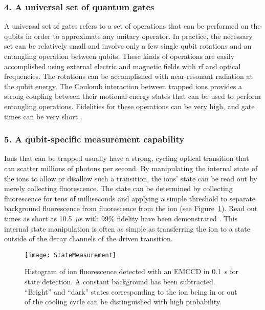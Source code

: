 \subsubsection{4. A universal set of quantum gates}

A universal set of gates refers to a set of operations that can be performed on the qubits in order to approximate any unitary operator.  In practice, the necessary set can be relatively small and involve only a few single qubit rotations and an entangling operation between qubits.  These kinds of operations are easily accomplished using external electric and magnetic fields with rf and optical frequencies.  The rotations can be accomplished with near-resonant radiation at the qubit energy. The Coulomb interaction between trapped ions provides a strong coupling between their motional energy states that can be used to perform entangling operations.  Fidelities for these operations can be very high, and gate times can be very short \cite{Mount:13}.

\subsubsection{5. A qubit-specific measurement capability}

Ions that can be trapped usually have a strong, cycling optical transition that can scatter millions of photons per second.  By manipulating the internal state of the ions to allow or disallow such a transition, the ions' state can be read out by merely collecting fluorescence.  The state can be determined by collecting fluorescence for tens of milliseconds and applying a simple threshold to separate background fluorescence from fluorescence from the ion (see Figure~\ref{fig:statedetection}).  Read out times as short as 10.5~$\mu$s with 99\% fidelity have been demonstrated \cite{Noek:13}.  This internal state manipulation is often as simple as transferring the ion to a state outside of the decay channels of the driven transition.

\begin{figure}
	\centering
	\texttt{[image: StateMeasurement]}
	\caption[Histogram of collected ion fluoresence for state detection]{Histogram of ion fluorescence detected with an EMCCD in 0.1~s for state detection.  A constant background has been subtracted.  ``Bright'' and ``dark'' states corresponding to the ion being in or out of the cooling cycle can be distinguished with high probability.} 
	\label{fig:statedetection}
\end{figure}

